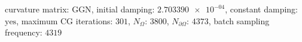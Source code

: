 curvature matrix: $\text{GGN}$, initial damping: $\num[scientific-notation=true]{2.703390e-04}$, constant damping: $\text{yes}$, maximum CG iterations: $\num[scientific-notation=false]{301}$, $N_{\Omega}$: $\num[scientific-notation=false]{3800}$, $N_{\partial\Omega}$: $\num[scientific-notation=false]{4373}$, batch sampling frequency: $\num[scientific-notation=false]{4319}$